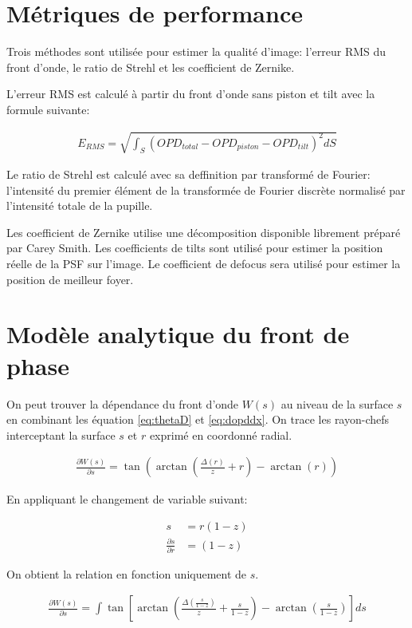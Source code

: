 \documentclass[a4paper,10pt]{article}
\numberwithin{equation}{section}
\numberwithin{figure}{section}
\numberwithin{table}{section}
\begin{document}
\section{Métriques de performance}

Trois méthodes sont utilisée pour estimer la qualité d'image: l'erreur RMS du front d'onde, le ratio de Strehl et les coefficient de Zernike.

L'erreur RMS est calculé à partir du front d'onde sans piston et tilt avec la formule suivante:

\begin{align}
	E_{RMS} = \sqrt{\int_S (OPD_{total} - OPD_{piston} - OPD_{tilt})^2 dS}
\end{align}

Le ratio de Strehl est calculé avec sa deffinition par transformé de Fourier: l'intensité du premier élément de la transformée de Fourier discrète normalisé par l'intensité totale de la pupille.

Les coefficient de Zernike utilise une décomposition disponible librement préparé par Carey Smith. Les coefficients de tilts sont utilisé pour estimer la position réelle de la PSF sur l'image. Le coefficient de defocus sera utilisé pour estimer la position de meilleur foyer.

\section{Modèle analytique du front de phase}

On peut trouver la dépendance du front d'onde $W(s)$ au niveau de la surface $s$ en combinant les équation \ref{eq:thetaD} et \ref{eq:dopddx}. On trace les rayon-chefs interceptant la surface $s$ et $r$ exprimé en coordonné radial.

\begin{align}
	\frac{\partial W(s)}{\partial s} = \tan(\arctan\left(\frac{\Delta(r)}{z} + r\right) - \arctan(r))
\end{align}

En appliquant le changement de variable suivant:

\begin{align}
	s &= r(1-z) \\
	\frac{\partial s}{\partial r} &= (1-z)
\end{align}

On obtient la relation en fonction uniquement de $s$.

\begin{align}
	\frac{\partial W(s)}{\partial s} = \int \tan\left[\arctan\left(\frac{\Delta(\frac{s}{1-z})}{z} + \frac{s}{1-z}\right) - \arctan\left(\frac{s}{1-z}\right)\right] ds
\end{align}
\end{document}
